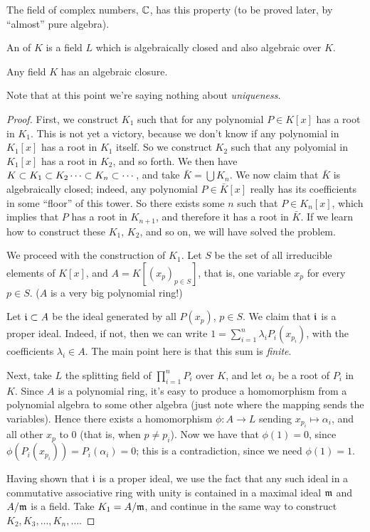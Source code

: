 \begin{ex}
The field of complex numbers, $\mathbb{C}$, has this property (to be proved later, by ``almost'' pure algebra).
\end{ex}

\begin{dfn}
An  of $K$ is a field $L$ which is algebraically closed and also algebraic over $K$.
\end{dfn}

\begin{thm}
Any field $K$ has an algebraic closure.
\end{thm}
Note that at this point we're saying nothing about \emph{uniqueness}.
\begin{proof}
First, we construct $K_1$ such that for any polynomial $P \in K[x]$ has a root in $K_1$. This is not yet a victory, because we don't know if any polynomial in $K_1[x]$ has a root in $K_1$ itself. So we construct $K_2$ such that any polyomial in $K_1[x]$ has a root in $K_2$, and so forth. We then have $K \subset K_1 \subset K_2 \dotsb \subset K_n \subset \dotsb$, and take $\bar{K} = \bigcup K_n$. We now claim that $\bar{K}$ is algebraically closed; indeed, any polynomial $P \in \bar{K}[x]$ really has its coefficients in some ``floor'' of this tower. So there exists some $n$ such that $P \in K_n[x]$, which implies that $P$ has a root in $K_{n+1}$, and therefore it has a root in $\bar{K}$. If we learn how to construct these $K_1$, $K_2$, and so on, we will have solved the problem.

We proceed with the construction of $K_1$. Let $S$ be the set of all irreducible elements of $K[x]$, and $A = K[(x_p)_{p \in S}]$, that is, one variable $x_p$ for every $p \in S$. 
($A$ is a very big polynomial ring!)

Let $\mathfrak{i} \subset A$ be the ideal generated by all $P(x_p)$, $p \in S$. 
We claim that $\mathfrak{i}$ is a proper ideal. 
Indeed, if not, then we can write $1 = \sum_{i=1}^{n} \lambda_i P_i(x_{p_i})$, with the coefficients $\lambda_i \in A$. 
The main point here is that this sum is \emph{finite}. 

Next, take $L$ the splitting field of $\prod_{i=1}^{n} P_i$ over $K$, and let $\alpha_i$ be a root of $P_i$ in $K$. 
Since $A$ is a polynomial ring, it's easy to produce a homomorphism from a polynomial algebra to some other algebra (just note where the mapping sends the variables). 
Hence there exists a homomorphism $\phi: A \to L$ sending $x_{p_i} \mapsto \alpha_i$, and all other $x_p$ to $0$ (that is, when $p \neq p_i$). 
Now we have that $\phi(1) = 0$, since $\phi(P_i(x_{p_i})) = P_i(\alpha_i) = 0$; this is a contradiction, since we need $\phi(1) = 1$.

Having shown that $\mathfrak{i}$ is a proper ideal, we use the fact that any such ideal in a commutative associative ring with unity is contained in a maximal ideal $\mathfrak{m}$ and $A / \mathfrak{m}$ is a field. Take $K_1 = A / \mathfrak{m}$, and continue in the same way to construct $K_2, K_3, \dotsc, K_n, \dotsc$.
\end{proof}
